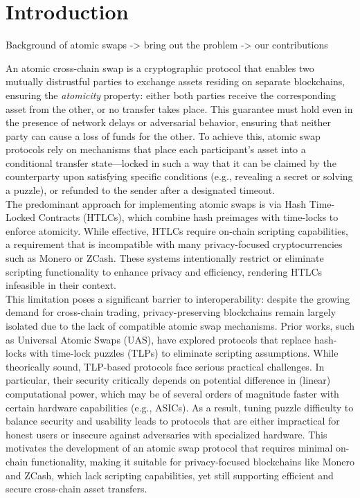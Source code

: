 
\section{Introduction}

\begin{todobox}
    Background of atomic swaps -> bring out the problem -> our contributions
\end{todobox}

An atomic cross-chain swap is a cryptographic protocol that enables two mutually distrustful parties to exchange assets residing on separate blockchains, ensuring the \textit{atomicity} property: either both parties receive the corresponding asset from the other, or no transfer takes place. This guarantee must hold even in the presence of network delays or adversarial behavior, ensuring that neither party can cause a loss of funds for the other. To achieve this, atomic swap protocols rely on mechanisms that place each participant’s asset into a conditional transfer state—locked in such a way that it can be claimed by the counterparty upon satisfying specific conditions (e.g., revealing a secret or solving a puzzle), or refunded to the sender after a designated timeout. \\
The predominant approach for implementing atomic swaps is via Hash Time-Locked Contracts (HTLCs), which combine hash preimages with time-locks to enforce atomicity. While effective, HTLCs require on-chain scripting capabilities, a requirement that is incompatible with many privacy-focused cryptocurrencies such as Monero or ZCash. These systems intentionally restrict or eliminate scripting functionality to enhance privacy and efficiency, rendering HTLCs infeasible in their context. \\
This limitation poses a significant barrier to interoperability: despite the growing demand for cross-chain trading, privacy-preserving blockchains remain largely isolated due to the lack of compatible atomic swap mechanisms. Prior works, such as Universal Atomic Swaps (UAS), have explored protocols that replace hash-locks with time-lock puzzles (TLPs) to eliminate scripting assumptions. While theorically sound, TLP-based protocols face serious practical challenges. In particular, their security critically depends on potential difference in (linear) computational power, which may be of several orders of magnitude faster with certain hardware capabilities (e.g., ASICs). As a result, tuning puzzle difficulty to balance security and usability leads to protocols that are either impractical for honest users or insecure against adversaries with specialized hardware.
This motivates the development of an atomic swap protocol that requires minimal on-chain functionality, making it suitable for privacy-focused blockchains like Monero and ZCash, which lack scripting capabilities, yet still supporting efficient and secure cross-chain asset transfers.

